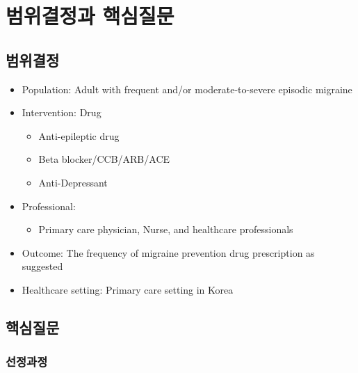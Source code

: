 \documentclass[]{book}
\providecommand{\tightlist}{%
  \setlength{\itemsep}{0pt}\setlength{\parskip}{0pt}}
\begin{document}
\hypertarget{section-48}{%
\chapter{범위결정과 핵심질문}\label{section-48}}

\hypertarget{section-49}{%
\section{범위결정}\label{section-49}}

\begin{itemize}
\item
  Population: Adult with frequent and/or moderate-to-severe episodic migraine
\item
  Intervention: Drug

  \begin{itemize}
  \tightlist
  \item
    Anti-epileptic drug
  \item
    Beta blocker/CCB/ARB/ACE
  \item
    Anti-Depressant
  \end{itemize}
\item
  Professional:

  \begin{itemize}
  \tightlist
  \item
    Primary care physician, Nurse, and healthcare professionals
  \end{itemize}
\item
  Outcome: The frequency of migraine prevention drug prescription as suggested
\item
  Healthcare setting: Primary care setting in Korea
\end{itemize}

\hypertarget{section-50}{%
\section{핵심질문}\label{section-50}}

\hypertarget{section-51}{%
\subsection{선정과정}\label{section-51}}
\end{document}
